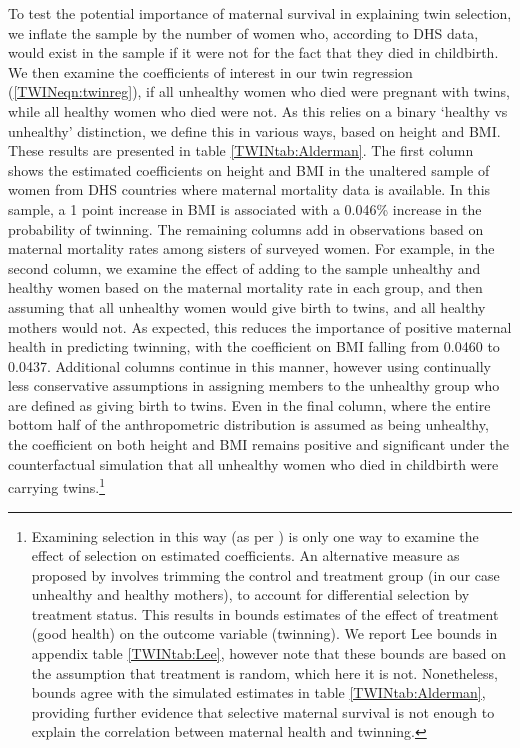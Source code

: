 \documentclass[subeqn]{article}
\begin{document}
\begin{spacing}{1.4}
To test the potential importance of maternal survival in explaining twin 
selection, we inflate the sample by the number of women who, according to 
DHS data, would exist in the sample if it were not for the fact that they died
in childbirth.  We then examine the coefficients of interest in our twin 
regression (\ref{TWINeqn:twinreg}), if all unhealthy women who died were 
pregnant with twins, while all healthy women who died were not.  As this relies 
on a binary `healthy vs unhealthy' distinction, we define this in various ways, 
based on height and BMI.  These results are presented in table 
\ref{TWINtab:Alderman}.  The first column shows the estimated coefficients on 
height and BMI in the unaltered sample of women from DHS countries where 
maternal mortality data is available.  In this sample, a 1 point increase in BMI
is associated with a 0.046\% increase in the probability of twinning. The 
remaining columns add in observations based on maternal mortality rates among 
sisters of surveyed women.  For example, in the second column, we examine the 
effect of adding to the sample unhealthy and healthy women based on the
maternal mortality rate in each group, and then assuming that all unhealthy
women would give birth to twins, and all healthy mothers would not. As
expected, this reduces the importance of positive maternal health in predicting
twinning, with the coefficient on BMI falling from 0.0460 to 0.0437. Additional
columns continue in this manner, however using continually less conservative
assumptions in assigning members to the unhealthy group who are defined as
giving birth to twins. Even in the final column, where the entire bottom half
of the anthropometric distribution is assumed as being unhealthy, the
coefficient on both height and BMI remains positive and significant under the
counterfactual simulation that all unhealthy women who died in childbirth were
carrying twins.\footnote{Examining selection in this way (as per
  \citet{Aldermanetal2011}) is only one way to examine the effect of selection
  on estimated coefficients.  An alternative measure as proposed by
  \citet{Lee2009} involves trimming the control and treatment group (in our
  case unhealthy and healthy mothers), to account for differential selection
  by treatment status.  This results in bounds estimates of the effect of
  treatment (good health) on the outcome variable (twinning). We report Lee
  bounds in appendix table \ref{TWINtab:Lee}, however note that these bounds
  are based on the assumption that treatment is random, which here it is not.
  Nonetheless, \citet{Lee2009} bounds agree with the simulated estimates in
  table \ref{TWINtab:Alderman}, providing further evidence that selective
  maternal survival is not enough to explain the correlation between maternal
  health and twinning.}


\end{spacing}
\end{document}
